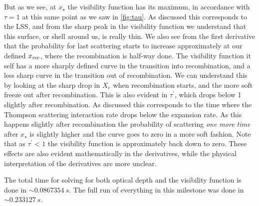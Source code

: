 \documentclass[10pt,a4paper]{article}
\begin{document}
But as we see, at $x_\star$ the visibility function has its maximum, in accordance with $\tau = 1$ at this same point as we saw in \cref{fig:tau}. As discussed this corresponds to the LSS, and from the sharp peak in the visibility function we understand that this surface, or shell around us, is really thin. We also see from the first derivative that the probability for last scattering starts to increase approximately at our defined $x_{\rm{rec}}$, where the recombination is half-way done. The visibility function it self has a more sharply defined curve in the transition into recombination, and a less sharp curve in the transition out of recombination. We can understand this by looking at the sharp drop in $X_e$ when recombination starts, and the more soft freeze out after recombination. This is also evident in $\tau^\prime$, which drops below 1 slightly after recombination. As discussed this corresponds to the time where the Thompson scattering interaction rate drops below the expansion rate. As this happens slightly after recombination the probability of scattering \textit{one more time} after $x_\star$ is slightly higher and the curve goes to zero in a more soft fashion. Note that as $\tau^\prime < 1$ the visibility function is approximately back down to zero. These effects are also evident mathematically in the derivatives, while the physical interpretation of the derivatives are more unclear.

The total time for solving for both optical depth and the visibility function is done in $\sim \SI{0.0867354}{s}$. The full run of everything in this milestone was done in $\sim \SI{0.233127}{s}$.



\end{document}
